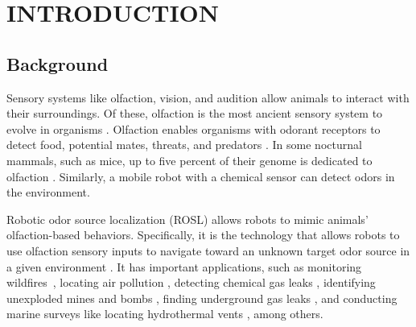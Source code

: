 \chapter{INTRODUCTION}\label{chap1:introduction}

\section{Background}\label{Sec:1_background}
Sensory systems like olfaction, vision, and audition allow animals to interact with their surroundings. Of these, olfaction is the most ancient sensory system to evolve in organisms \cite{purves2001organization}. Olfaction enables organisms with odorant receptors to detect food, potential mates, threats, and predators \cite{sarafoleanu2009importance}. In some nocturnal mammals, such as mice, up to five percent of their genome is dedicated to olfaction \cite{ibarra2014olfactory}. 
Similarly, a mobile robot with a chemical sensor can detect odors in the environment.

Robotic odor source localization (ROSL) allows robots to mimic animals' olfaction-based behaviors. Specifically, it is the technology that allows robots to use olfaction sensory inputs to navigate toward an unknown target odor source in a given environment \cite{kowadlo2008robot}. %
It has important applications, such as monitoring \mbox{wildfires \cite{wang2023vision}}, locating air pollution \cite{fu2019pollution}, detecting chemical gas leaks \cite{burgues2019smelling}, identifying unexploded mines and bombs \cite{russell2004robotic}, finding underground gas leaks \cite{chen2017underground}, and conducting marine surveys like locating hydrothermal vents \cite{wang20203}, among others.

